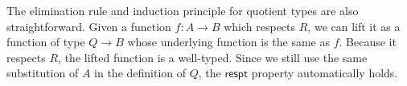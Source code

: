 The elimination rule and induction principle for quotient types are also straightforward. Given a function $f : A \to B$ which respects $R$, we can lift it as a function of type $Q \to B$ whose underlying function is the same as $f$. Because it respects $R$, the lifted function is a well-typed. Since we still use the same substitution of $A$ in the definition of $Q$, the $\mathsf{respt}$ property automatically holds.

\begin{code}
\\
\>[0]\<[2]%
\>[2] \AgdaSymbol{:} \AgdaSymbol{(} \AgdaSymbol{:}  \AgdaSymbol{)} \<[22]%
\>[22]\<%
\\
\>[2]\<[9]%
\>[9] \AgdaSymbol{(} \AgdaSymbol{:}  \AgdaSymbol{(}  \AgdaSymbol{))}\<%
\\
\>[2]\<[9]%
\>[9] \AgdaSymbol{(} \AgdaSymbol{:}    \<%
\\
\>[9]\<[18]%
\>[18] \AgdaSymbol{(}   \AgdaSymbol{)}\<%
\\
\>[9]\<[18]%
\>[18] \AgdaFunction{[} \AgdaFunction{[}  \AgdaFunction{]fm}  \AgdaFunction{]}  \AgdaSymbol{(}\AgdaFunction{[}  \AgdaFunction{]tm} \AgdaSymbol{)}  \<[53]%
\>[53]\<%
\\
\>[18]\<[20]%
\>[20] \<[23]%
\>[23] \AgdaSymbol{(}\AgdaFunction{[}  \AgdaFunction{]tm} \AgdaSymbol{)} \AgdaSymbol{)}\<%
\\
\>[-7]\<[9]%
\>[9]  \AgdaSymbol{(}  \AgdaSymbol{)}\<%
\\
\>[0]\<[2]%
\>[2]    \AgdaSymbol{=} \<%
\\
\>[2]\<[11]%
\>[11]\AgdaSymbol{\{}  \AgdaSymbol{=}     \AgdaSymbol{(}\AgdaFunction{[}  \AgdaFunction{]tm} \AgdaSymbol{)} \AgdaInductiveConstructor{,}      \<[54]%

\end{code}
